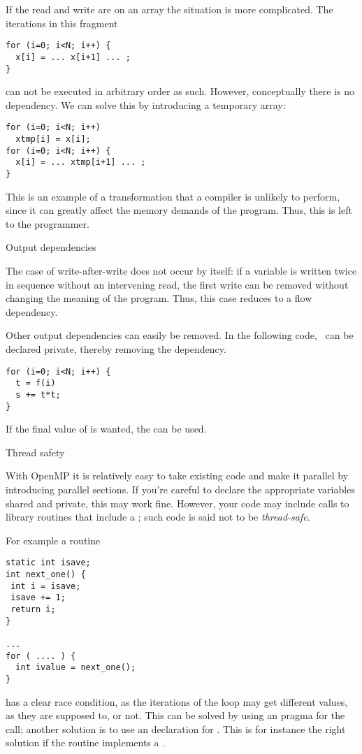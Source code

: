 If the read and write are on an array the situation is more complicated.
The iterations in this fragment
\begin{verbatim}
for (i=0; i<N; i++) {
  x[i] = ... x[i+1] ... ;
}
\end{verbatim}
can not be executed in arbitrary order as such. However, conceptually there
is no dependency. We can solve this by introducing a temporary array:
\begin{verbatim}
for (i=0; i<N; i++)
  xtmp[i] = x[i];
for (i=0; i<N; i++) {
  x[i] = ... xtmp[i+1] ... ;
}
\end{verbatim}
This is an example of a transformation that a compiler is unlikely
to perform, since it can greatly affect the memory demands of the program.
Thus, this is left to the programmer.

 {Output dependencies}

The case of write-after-write does not occur by itself:
if a variable is written twice in sequence without an intervening
read, the first write can be removed without changing the meaning of the program.
Thus, this case reduces to a flow dependency.

Other output dependencies can easily be removed. In the following code, ~can be
declared private, thereby removing the dependency.
\begin{verbatim}
for (i=0; i<N; i++) {
  t = f(i)
  s += t*t;
}
\end{verbatim}
If the final value of  is wanted, the  can be used.


 {Thread safety}

With OpenMP it is relatively easy to take existing code and make
it parallel by introducing parallel sections. If you're careful
to declare the appropriate variables shared and private,
this may work fine. However, your code may include
calls to library routines that include a ;
such code is said not to be \emph{thread-safe}.

For example a routine
\begin{verbatim}
static int isave;
int next_one() {
 int i = isave;
 isave += 1;
 return i;
}

...
for ( .... ) {
  int ivalue = next_one();
}
\end{verbatim}
has a clear race condition, as the iterations of the loop
may get different  values, as they are supposed to,
or not. This can be solved by using an 
pragma for the  call; another solution 
is to use an  declaration for .
This is for instance the right solution if  the 
routine implements a .

